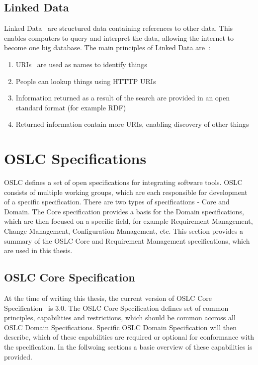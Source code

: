 \subsection*{Linked Data}
Linked Data \cite{linked_data} are structured data containing references to other data. This enables computers to query and interpret the data, allowing the internet to become one big database. The main principles of Linked Data are \cite{linked_data_design_issues}:
\begin{enumerate}
  \item URIs \cite{uri_rfc} are used as names to identify things
  \item People can lookup things using HTTTP URIs
  \item Information returned as a result of the search are provided in an open standard format (for example RDF)
  \item Returned information contain more URIs, enabling discovery of other things
\end{enumerate}

\section{OSLC Specifications}
OSLC defines a set of open specifications for integrating software tools. OSLC consists of multiple working groups, which are each responsible for development of a specific specification. There are two types of specifications - Core and Domain. The Core specification provides a basis for the Domain specifications, which are then focused on a specific field, for example Requirement Management, Change Management, Configuration Management, etc. This section provides a summary of the OSLC Core and Requirement Management specifications, which are used in this thesis.

\subsection{OSLC Core Specification}
At the time of writing this thesis, the current version of OSLC Core Specification \cite{oslc_core_specification} is 3.0. The OSLC Core Specification defines set of common principles, capabilities and restrictions, which should be common accross all OSLC Domain Specifications. Specific OSLC Domain Specification will then describe, which of these capabilities are required or optional for conformance with the specification. In the follwoing sections a basic overview of these capabilities is provided.

